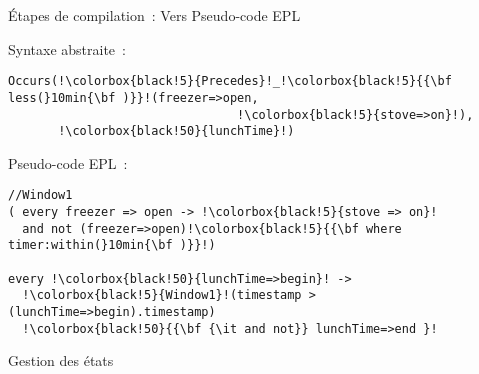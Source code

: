 \begin{frame}[fragile]{Étapes de compilation~: Vers Pseudo-code EPL}
\addtocounter{framenumber}{-1}
\vspace*{3.4mm}
  \begin{minipage}{.45\linewidth}
      \begin{coloredbox}[black]{\tiny Syntaxe abstraite~:}
      \begin{lstlisting}[language=Maloya,basicstyle=\ttfamily\tiny,escapechar=!]
Occurs(!\colorbox{black!5}{Precedes}!_!\colorbox{black!5}{{\bf less(}10min{\bf )}}!(freezer=>open,
                                !\colorbox{black!5}{stove=>on}!),
       !\colorbox{black!50}{lunchTime}!)
      \end{lstlisting}
\end{coloredbox}
    \vfill
            \begin{coloredbox}[black]{\tiny Pseudo-code EPL~:}
      \begin{lstlisting}[language=EPLPseudoCode,basicstyle=\ttfamily\tiny,escapechar=!]
//Window1
( every freezer => open -> !\colorbox{black!5}{stove => on}! 
  and not (freezer=>open)!\colorbox{black!5}{{\bf where timer:within(}10min{\bf )}}!) 

every !\colorbox{black!50}{lunchTime=>begin}! ->
  !\colorbox{black!5}{Window1}!(timestamp > (lunchTime=>begin).timestamp)
  !\colorbox{black!50}{{\bf {\it and not}} lunchTime=>end }!
      \end{lstlisting}
\end{coloredbox}
  \end{minipage}
  \hfill
  \begin{minipage}{.52\linewidth}
    \vspace*{-69.1mm}
    \begin{tiny}
      \colorbox{black!50}{Gestion des états}
    \end{tiny}
  \end{minipage}
\end{frame}


